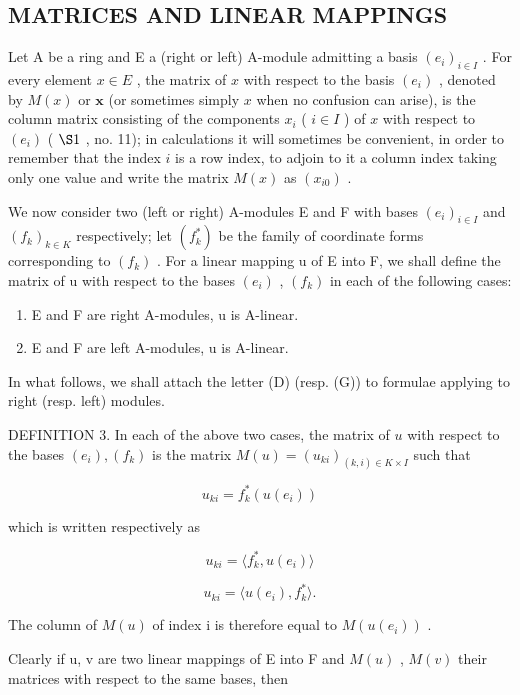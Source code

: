 \subsection{MATRICES AND LINEAR MAPPINGS}

Let A be a ring and E a (right or left) A-module admitting a basis \((e_i)_{i\in I}\) . For every element \(x\in E\) , the matrix of \(x\) with respect to the basis \((e_i)\) , denoted by \(M(x)\) or \(\mathbf{x}\) (or sometimes simply \(x\) when no confusion can arise), is the column matrix consisting of the components \(x_i\) ( \(i\in I\) ) of \(x\) with respect to \((e_i)\) ( \(\S 1\) , no. 11); in calculations it will sometimes be convenient, in order to remember that the index \(i\) is a row index, to adjoin to it a column index taking only one value and write the matrix \(M(x)\) as \((x_{i0})\) .

We now consider two (left or right) A-modules E and F with bases \((e_{i})_{i\in I}\) and \((f_{k})_{k\in K}\) respectively; let \((f_{k}^{*})\) be the family of coordinate forms corresponding to \((f_{k})\) . For a linear mapping u of E into F, we shall define the matrix of u with respect to the bases \((e_{i})\) , \((f_{k})\) in each of the following cases:

\begin{enumerate}
\def\labelenumi{(\Alph{enumi})}
\setcounter{enumi}{3}
\item
  E and F are right A-modules, u is A-linear.
\item
  E and F are left A-modules, u is A-linear.
\end{enumerate}

In what follows, we shall attach the letter (D) (resp. (G)) to formulae applying to right (resp. left) modules.

DEFINITION 3. In each of the above two cases, the matrix of \(u\) with respect to the bases \((e_i), (f_k)\) is the matrix \(M(u) = (u_{ki})_{(k,i) \in K \times I}\) such that

\[
u _ {k i} = f _ {k} ^ {*} (u (e _ {i}))\tag{14}
\]

which is written respectively as

\[
u _ {k i} = \langle f _ {k} ^ {*}, u (e _ {i}) \rangle\tag{14 D}
\]

\[
u _ {k i} = \langle u (e _ {i}), f _ {k} ^ {*} \rangle .\tag{14 G}
\]

The column of \(M(u)\) of index i is therefore equal to \(M(u(e_{i}))\) .

Clearly if u, v are two linear mappings of E into F and \(M(u)\) , \(M(v)\) their matrices with respect to the same bases, then

